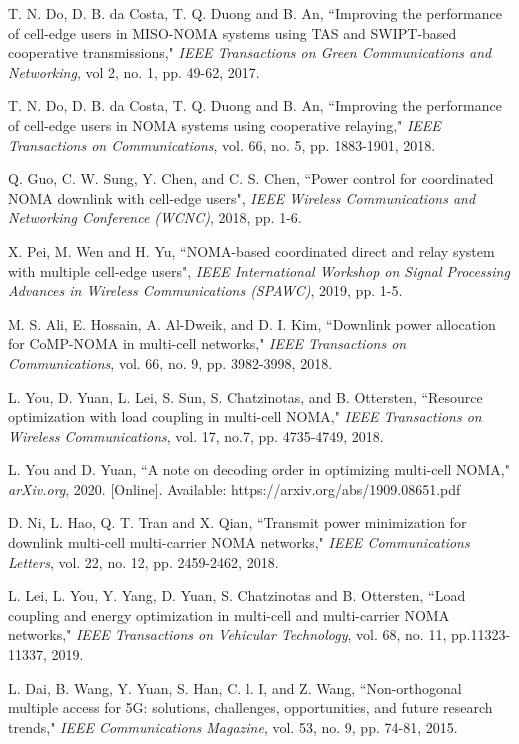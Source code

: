 \documentclass[10pt,journal,final,finalsubmission,twocolumn]{IEEEtran}
\begin{document}
\begin{thebibliography}{99}

  T. N. Do, D. B. da Costa, T. Q. Duong and B. An, ``Improving the performance of cell-edge users in MISO-NOMA systems using TAS and SWIPT-based cooperative transmissions," {\em IEEE Transactions on Green Communications and Networking}, vol 2, no. 1, pp. 49-62, 2017.

 T. N. Do, D. B. da Costa, T. Q. Duong and B. An, ``Improving the performance of cell-edge users in NOMA systems using cooperative relaying," {\em IEEE Transactions on Communications}, vol. 66, no. 5, pp. 1883-1901, 2018.

 Q. Guo, C. W. Sung, Y. Chen, and C. S. Chen, ``Power control for coordinated NOMA downlink with cell-edge users", {\em IEEE Wireless Communications and Networking Conference (WCNC)}, 2018, pp. 1-6.

 X. Pei, M. Wen and H. Yu, ``NOMA-based coordinated direct and relay system with multiple cell-edge users",  {\em IEEE International Workshop on Signal Processing Advances in Wireless Communications (SPAWC)}, 2019, pp. 1-5.

 M. S. Ali, E. Hossain, A. Al-Dweik, and D. I. Kim, ``Downlink power allocation for CoMP-NOMA in
multi-cell networks," {\em IEEE Transactions on Communications}, vol. 66, no. 9, pp. 3982-3998, 2018. 

 L. You, D. Yuan, L. Lei, S. Sun, S. Chatzinotas, and B. Ottersten, ``Resource optimization with load coupling in multi-cell NOMA," {\em IEEE Transactions on Wireless Communications}, vol. 17, no.7, pp. 4735-4749, 2018.

 L. You and D. Yuan, ``A note on decoding order in optimizing multi-cell NOMA," {\em arXiv.org}, 2020. [Online]. Available: https://arxiv.org/abs/1909.08651.pdf

 D. Ni, L. Hao, Q. T. Tran and X. Qian, ``Transmit power minimization for downlink multi-cell multi-carrier NOMA networks," {\em IEEE Communications Letters}, vol. 22, no. 12, pp. 2459-2462, 2018.

 L. Lei, L. You, Y. Yang, D. Yuan, S. Chatzinotas and B. Ottersten, ``Load coupling and energy optimization in multi-cell and multi-carrier NOMA networks," {\em  IEEE Transactions on Vehicular Technology}, vol. 68, no. 11, pp.11323-11337, 2019.

 L. Dai, B. Wang, Y. Yuan, S. Han, C. l. I, and Z. Wang, ``Non-orthogonal multiple access for 5G: solutions, challenges, opportunities, and future research trends," {\em IEEE Communications Magazine}, vol. 53, no. 9, pp. 74-81, 2015.


\end{thebibliography}
\end{document}
